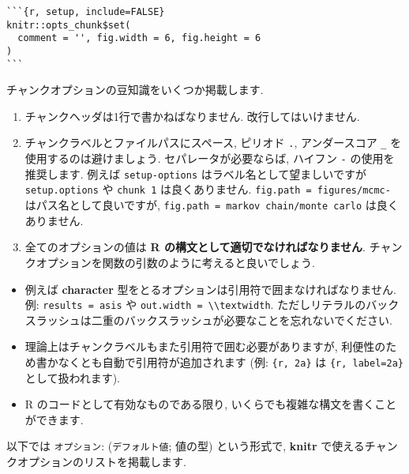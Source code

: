 \documentclass[
]{bxjsreport}
\providecommand{\tightlist}{%
  \setlength{\itemsep}{0pt}\setlength{\parskip}{0pt}}
\begin{document}
\begin{verbatim}
```{r, setup, include=FALSE}
knitr::opts_chunk$set(
  comment = '', fig.width = 6, fig.height = 6
)
```
\end{verbatim}

チャンクオプションの豆知識をいくつか掲載します.

\begin{enumerate}
\def\labelenumi{\arabic{enumi}.}
\tightlist
\item
  チャンクヘッダは1行で書かねばなりません. 改行してはいけません.
\item
  チャンクラベルとファイルパスにスペース, ピリオド \texttt{.},
  アンダースコア \texttt{\_} を使用するのは避けましょう.
  セパレータが必要ならば, ハイフン \texttt{-} の使用を推奨します. 例えば
  \texttt{setup-options} はラベル名として望ましいですが
  \texttt{setup.options} や \texttt{chunk\ 1} は良くありません.
  \texttt{fig.path\ =\ \textquotesingle{}figures/mcmc-\textquotesingle{}}
  はパス名として良いですが,
  \texttt{fig.path\ =\ \textquotesingle{}markov\ chain/monte\ carlo\textquotesingle{}}
  は良くありません.
\item
  全てのオプションの値は \textbf{R
  の構文として適切でなければなりません}.
  チャンクオプションを関数の引数のように考えると良いでしょう.
\end{enumerate}

\begin{itemize}
\tightlist
\item
  例えば \textbf{character}
  型をとるオプションは引用符で囲まなければなりません. 例:
  \texttt{results\ =\ \textquotesingle{}asis\textquotesingle{}} や
  \texttt{out.width\ =\ \textquotesingle{}\textbackslash{}\textbackslash{}textwidth\textquotesingle{}}.
  ただしリテラルのバックスラッシュは二重のバックスラッシュが必要なことを忘れないでください.
\item
  理論上はチャンクラベルもまた引用符で囲む必要がありますが,
  利便性のため書かなくとも自動で引用符が追加されます (例:
  \texttt{\textasciigrave{}\textasciigrave{}\textasciigrave{}\{r,\ 2a\}\textasciigrave{}\textasciigrave{}\textasciigrave{}}
  は
  \texttt{\textasciigrave{}\textasciigrave{}\textasciigrave{}\{r,\ label=\textquotesingle{}2a\textquotesingle{}\}\textasciigrave{}\textasciigrave{}\textasciigrave{}}
  として扱われます).
\item
  R のコードとして有効なものである限り,
  いくらでも複雑な構文を書くことができます.
\end{itemize}

以下では \texttt{オプション}: (\texttt{デフォルト値}; 値の型)
という形式で, \textbf{knitr}
で使えるチャンクオプションのリストを掲載します.
\end{document}
